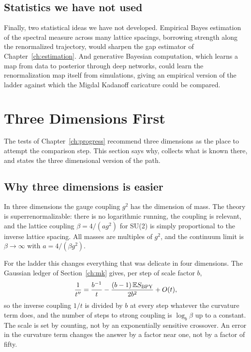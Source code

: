 \subsection{Statistics we have not used}

Finally, two statistical ideas we have not developed. Empirical Bayes estimation of the spectral measure across many lattice spacings, borrowing strength along the renormalized trajectory, would sharpen the gap estimator of Chapter~\ref{ch:estimation}. And generative Bayesian computation, which learns a map from data to posterior through deep networks, could learn the renormalization map itself from simulations, giving an empirical version of the ladder against which the Migdal Kadanoff caricature could be compared.

\section{Three Dimensions First}\label{ch:threed}

The tests of Chapter~\ref{ch:progress} recommend three dimensions as the place to attempt the comparison step. This section says why, collects what is known there, and states the three dimensional version of the path.

\subsection{Why three dimensions is easier}

In three dimensions the gauge coupling $g^2$ has the dimension of mass. The theory is superrenormalizable: there is no logarithmic running, the coupling is relevant, and the lattice coupling $\beta=4/(ag^2)$ for SU(2) is simply proportional to the inverse lattice spacing. All masses are multiples of $g^2$, and the continuum limit is $\beta\to\infty$ with $a=4/(\beta g^2)$.

For the ladder this changes everything that was delicate in four dimensions. The Gaussian ledger of Section~\ref{ch:mk} gives, per step of scale factor $b$,
\[
\frac1{t''}=\frac{b^{-1}}{t}-\frac{(b-1)\,\mathbb{E} S_{\mathrm{BPY}}}{2b^2}+O(t),
\]
so the inverse coupling $1/t$ is divided by $b$ at every step whatever the curvature term does, and the number of steps to strong coupling is $\log_b\beta$ up to a constant. The scale is set by counting, not by an exponentially sensitive crossover. An error in the curvature term changes the answer by a factor near one, not by a factor of fifty.

